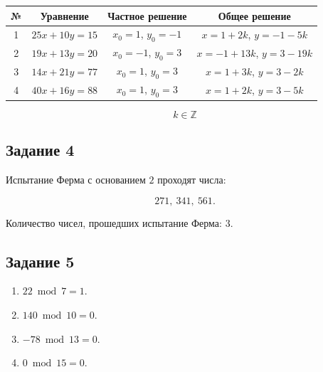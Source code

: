 \documentclass[a4paper,12pt]{article}
\begin{document}
\begin{center}
  \begin{tabular}{|c|c|c|c|}
    \hline
    № & Уравнение & Частное решение & Общее решение \\
    \hline
    1 & $25x + 10y = 15$ & $x_0 = 1$, $y_0 = -1$ & $x = 1 + 2k$, $y =
    -1 - 5k$ \\
    \hline
    2 & $19x + 13y = 20$ & $x_0 = -1$, $y_0 = 3$ & $x = -1 + 13k$, $y
    = 3 - 19k$ \\
    \hline
    3 & $14x + 21y = 77$ & $x_0 = 1$, $y_0 = 3$ & $x = 1 + 3k$, $y = 3 - 2k$ \\
    \hline
    4 & $40x + 16y = 88$ & $x_0 = 1$, $y_0 = 3$ & $x = 1 + 2k$, $y = 3 - 5k$ \\
    \hline
  \end{tabular}
\end{center}

\[
  k \in \mathbb{Z}
\]

\subsection*{Задание 4}

Испытание Ферма с основанием $2$ проходят числа:

\[
  271,\ 341,\ 561.
\]

Количество чисел, прошедших испытание Ферма: 3.

\subsection*{Задание 5}

\begin{enumerate}
  \item $22 \bmod 7 = 1$.
  \item $140 \bmod 10 = 0$.
  \item $-78 \bmod 13 = 0$.
  \item $0 \bmod 15 = 0$.
\end{enumerate}
\end{document}
